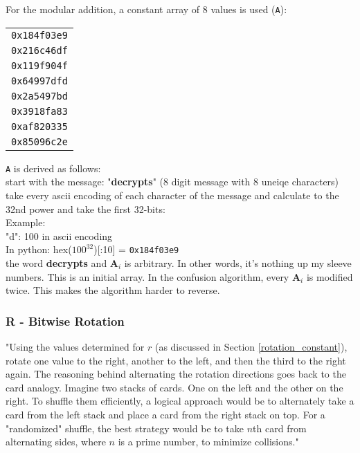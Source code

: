 \documentclass[fleqn, a4paper,12pt]{article}
\begin{document}
For the modular addition, a constant array of 8 values is used (\texttt{A}):

\begin{center}
	\begin{tabular}{c}
		\texttt{0x184f03e9} \\
		\texttt{0x216c46df} \\
		\texttt{0x119f904f} \\
		\texttt{0x64997dfd} \\
		\texttt{0x2a5497bd} \\
		\texttt{0x3918fa83} \\
		\texttt{0xaf820335} \\
		\texttt{0x85096c2e} \\
	\end{tabular}
\end{center}

\texttt{A} is derived as follows:
\\
start with the message: "\textbf{decrypts}" (8 digit message with 8 uneiqe characters)
\\
take every ascii encoding of each character of the message and calculate to the 32nd power and take the first 32-bits:
\\
Example:\\
"d": 100 in ascii encoding\\
In python: hex($100^{32}$)[:10] = \texttt{0x184f03e9}
\\
the word \textbf{decrypts} and $\textbf{A}_i$ is arbitrary. In other words, it's nothing up my sleeve numbers. This is an initial array. In the confusion algorithm, every $\textbf{A}_i$ is modified twice. This makes the algorithm harder to reverse.

\subsubsection{R - Bitwise Rotation} %

"Using the values determined for $r$ (as discussed in Section \ref{rotation_constant}), rotate one value to the right, another to the left, and then the third to the right again. The reasoning behind alternating the rotation directions goes back to the card analogy. Imagine two stacks of cards. One on the left and the other on the right. To shuffle them efficiently, a logical approach would be to alternately take a card from the left stack and place a card from the right stack on top. For a "randomized" shuffle, the best strategy would be to take $n$th card from alternating sides, where $n$ is a prime number, to minimize collisions."
\end{document}

